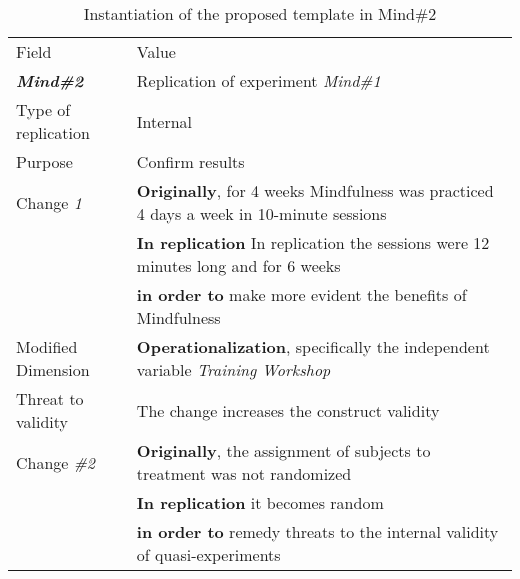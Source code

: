 \begin{table*}[h]
  \caption{Instantiation of the proposed template in Mind\#2}
  
\label{tab:plantEng}
  \centering

\begin{tabularx}{\textwidth}{
  >{\hsize=0.3\hsize}X
  >{\hsize=0.8\hsize}X}
  
    \noalign{\smallskip}\hline\noalign{\smallskip}
  
  Field &  Value  \\ 
  \noalign{\smallskip}\hline\noalign{\smallskip}
  
 \textbf {\textit{Mind\#2}} & Replication of experiment   \textit{Mind\#1}    \\
Type of replication &  Internal   \\ 
Purpose  &   Confirm results   \\  
 \hline
    Change \textit{1}   & \textbf{Originally}, for 4 weeks Mindfulness was practiced 4 days a week in 10-minute sessions \\& \textbf{In replication} In replication the sessions were 12 minutes long and for 6 weeks \\& \textbf{in order to}  make more evident the benefits of Mindfulness \\
    
    Modified Dimension & 
    \textbf{Operationalization}, specifically the independent variable  \textit {Training Workshop} \\   
    Threat to validity & The change increases the construct validity  \\  \hline
  
   Change \textit{\#2}   &  \textbf{Originally}, the assignment of subjects to treatment was not randomized 
   \\& \textbf{In replication} it becomes random  \\&
    \textbf{in order to} remedy threats to the internal validity of quasi-experiments\\
  

\end{tabularx}
\end{table*}
